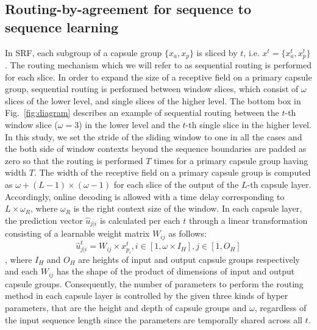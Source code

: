 \documentclass[review]{elsarticle}
\begin{document}
\subsection{Routing-by-agreement for sequence to sequence learning}
In SRF, each subgroup of a capsule group $\{x_a, x_p\}$ is sliced by $t$, i.e. $x^t=\{x_a^t, x_p^t\}$. The routing mechanism which we will refer to as sequential routing is performed for each slice.
In order to expand the size of a receptive field on a primary capsule group, sequential routing is performed between window slices, which consist of $\omega$ slices of the lower level, and single slices of the higher level.
The bottom box in Fig.~\ref{fig:diagram} describes an example of sequential routing between the $t$-th window slice ($\omega = 3$) in the lower level and the $t$-th single slice in the higher level.
In this study, we set the stride of the sliding window to one in all the cases and the both side of window contexts beyond the sequence boundaries are padded as zero so that the routing is performed $T$ times for a primary capsule group having width $T$.
The width of the receptive field on a primary capsule group is computed as $\omega + (L-1) \times (\omega - 1)$ for each slice of the output of the $L$-th capsule layer.
Accordingly, online decoding is allowed with a time delay corresponding to $L \times \omega_R$, where $\omega_R$ is the right context size of the window.
In each capsule layer, the prediction vector $\hat{u}_{j|i}$ is calculated per each $t$ through a linear transformation consisting of a learnable weight matrix $W_{ij}$ as follows:
\begin{equation}
\hat{u}_{j|i}^t = W_{ij} \times x_{p_i}^t, i \in [1, \omega \times I_H], j \in [1, O_H]
\label{eq:uhat}
\end{equation}
, where $I_H$ and $O_H$ are heights of input and output capsule groups respectively and each $W_{ij}$ has the shape of the product of dimensions of input and output capsule groups.
Consequently, the number of parameters to perform the routing method in each capsule layer is controlled by the given three kinds of hyper parameters, that are the height and depth of capsule groups and $\omega$, regardless of the input sequence length since the parameters are temporally shared across all $t$.
\end{document}
